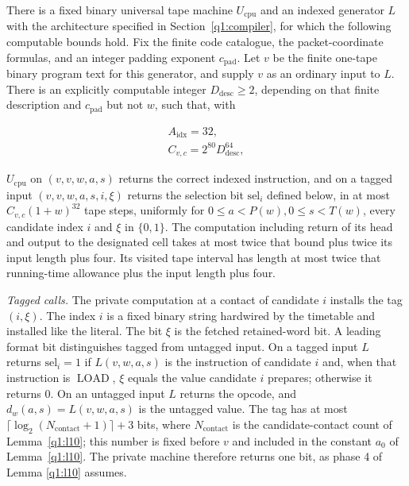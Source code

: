 \begin{lemma}\label{q1:l8}


There is a fixed binary universal tape machine \(U_{\mathrm{cpu}}\) and an indexed generator \(L\) with the architecture specified in Section~\ref{q1:compiler}, for which the following computable bounds hold. Fix the finite code catalogue, the packet-coordinate formulas, and an integer padding exponent \(c_{\mathrm{pad}}\). Let \(v\) be the finite one-tape binary program text for this generator, and supply \(v\) as an ordinary input to \(L\). There is an explicitly computable integer \(D_{\mathrm{desc}}\ge 2\), depending on that finite description and \(c_{\mathrm{pad}}\) but not \(w\), such that, with

\[
\begin{gathered}
A_{\mathrm{idx}}=32, \\ C_{v,c}=2^{80} D_{\mathrm{desc}}^{64},
\end{gathered}
\]

\(U_{\mathrm{cpu}}\) on \((v,v,w,a,s)\) returns the correct indexed instruction, and on a tagged input \((v,v,w,a,s,i,\xi)\) returns the selection bit \(\mathrm{sel}_{i}\) defined below, in at most \(C_{v,c}(1+w)^{32}\) tape steps, uniformly for \(0\le a<P(w), 0\le s<T(w)\), every candidate index \(i\) and \(\xi\) in \(\{0,1\}\). The computation including return of its head and output to the designated cell takes at most twice that bound plus twice its input length plus four. Its visited tape interval has length at most twice that running-time allowance plus the input length plus four.

\emph{Tagged calls.} The private computation at a contact of candidate \(i\) installs the tag \((i,\xi)\). The index \(i\) is a fixed binary string hardwired by the timetable and installed like the literal. The bit \(\xi\) is the fetched retained-word bit. A leading format bit distinguishes tagged from untagged input. On a tagged input \(L\) returns \(\mathrm{sel}_{i} = 1\) if \(L(v,w,a,s)\) is the instruction of candidate \(i\) and, when that instruction is \(\operatorname{LOAD}\), \(\xi\) equals the value candidate \(i\) prepares; otherwise it returns 0. On an untagged input \(L\) returns the opcode, and \(d_{w}(a,s) = L(v,w,a,s)\) is the untagged value. The tag has at most \(\lceil\log_{2}(N_{\mathrm{contact}}+1)\rceil+3\) bits, where \(N_{\mathrm{contact}}\) is the candidate-contact count of Lemma~\ref{q1:l10}; this number is fixed before \(v\) and included in the constant \(a_{0}\) of Lemma~\ref{q1:l10}. The private machine therefore returns one bit, as phase 4 of Lemma \ref{q1:l10} assumes.


\end{lemma}
